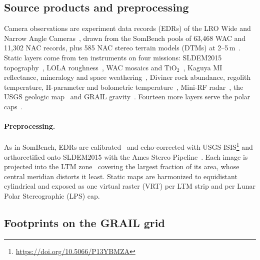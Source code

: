\subsection{Source products and preprocessing}
\label{sec:sources}

Camera observations are experiment data records (EDRs) of the LRO Wide and Narrow Angle Cameras~\cite{robinson2010lunar}, drawn from the SomBench pools of 63,468 WAC and 11,302 NAC records, plus 585 NAC stereo terrain models (DTMs) at 2--5\,m~\cite{henriksen2017extracting}. Static layers come from ten instruments on four missions: SLDEM2015 topography~\cite{barker2016new}, LOLA roughness~\cite{kreslavsky2013lunar,neumann2015copernican}, WAC mosaics and TiO$_2$~\cite{speyerer2011lunar,boyd2012lunar,wagner2015new,sato2017lunar}, Kaguya MI reflectance, mineralogy and space weathering~\cite{ohtake2008performance,lemelin2016global,trang2019improved}, Diviner rock abundance, regolith temperature, H-parameter and bolometric temperature~\cite{paige2010lunar,powell2023high,hayne2017global,williams2017global}, Mini-RF radar~\cite{nozette2010lunar,fassett2024improved}, the USGS geologic map~\cite{fortezzo2020release} and GRAIL gravity~\cite{zuber2013gravity}. Fourteen more layers serve the polar caps~\cite{williams2019seasonal,schorghofer2020mapping,mazarico2011illumination,lemelin2016improved,lemelin2022compositional,lawrence2022global}.

\paragraph{Preprocessing.}
\label{sec:preprocessing}
As in SomBench, EDRs are calibrated~\cite{mahanti2016inflight,humm2016flight} and echo-corrected with USGS ISIS\footnote{\url{https://doi.org/10.5066/P13YBMZA}} and orthorectified onto SLDEM2015 with the Ames Stereo Pipeline~\cite{beyer2018ames}. Each image is projected into the LTM zone~\cite{mcclernan2025lunar} covering the largest fraction of its area, whose central meridian distorts it least. Static maps are harmonized to equidistant cylindrical and exposed as one virtual raster (VRT) per LTM strip and per Lunar Polar Stereographic (LPS) cap.

\subsection{Footprints on the GRAIL grid}
\label{sec:grid}

